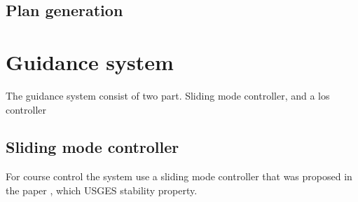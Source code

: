 \subsection{Plan generation}\label{SS:PlanGeneration}
\section{Guidance system}
The guidance system consist of two part. Sliding mode controller, and a los controller

\subsection{Sliding mode controller}
For course control the system use a sliding mode controller that was proposed in the paper \citep{fortuna2015cascaded}, which USGES stability property.